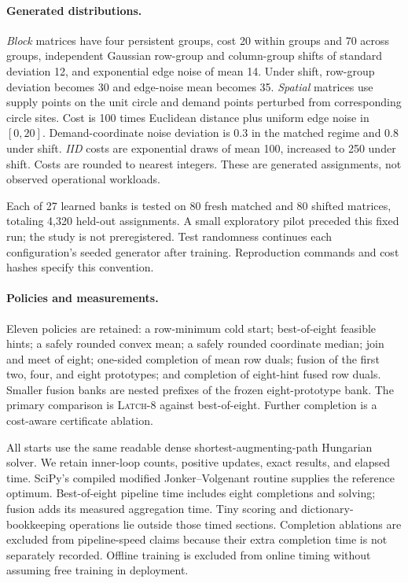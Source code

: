 \documentclass[10pt,letterpaper]{article}
\newcommand{\LATCH}{\textsc{Latch}}
\begin{document}
\paragraph{Generated distributions.}
\emph{Block} matrices have four persistent groups, cost 20 within groups and 70 across groups, independent Gaussian row-group and column-group shifts of standard deviation 12, and exponential edge noise of mean 14. Under shift, row-group deviation becomes 30 and edge-noise mean becomes 35. \emph{Spatial} matrices use supply points on the unit circle and demand points perturbed from corresponding circle sites. Cost is 100 times Euclidean distance plus uniform edge noise in $[0,20]$. Demand-coordinate noise deviation is 0.3 in the matched regime and 0.8 under shift. \emph{IID} costs are exponential draws of mean 100, increased to 250 under shift. Costs are rounded to nearest integers. These are generated assignments, not observed operational workloads.

Each of 27 learned banks is tested on 80 fresh matched and 80 shifted matrices, totaling 4,320 held-out assignments. A small exploratory pilot preceded this fixed run; the study is not preregistered. Test randomness continues each configuration's seeded generator after training. Reproduction commands and cost hashes specify this convention.

\paragraph{Policies and measurements.}
Eleven policies are retained: a row-minimum cold start; best-of-eight feasible hints; a safely rounded convex mean; a safely rounded coordinate median; join and meet of eight; one-sided completion of mean row duals; fusion of the first two, four, and eight prototypes; and completion of eight-hint fused row duals. Smaller fusion banks are nested prefixes of the frozen eight-prototype bank. The primary comparison is \LATCH{}-8 against best-of-eight. Further completion is a cost-aware certificate ablation.

All starts use the same readable dense shortest-augmenting-path Hungarian solver. We retain inner-loop counts, positive updates, exact results, and elapsed time. SciPy's compiled modified Jonker--Volgenant routine supplies the reference optimum. Best-of-eight pipeline time includes eight completions and solving; fusion adds its measured aggregation time. Tiny scoring and dictionary-bookkeeping operations lie outside those timed sections. Completion ablations are excluded from pipeline-speed claims because their extra completion time is not separately recorded. Offline training is excluded from online timing without assuming free training in deployment.
\end{document}
